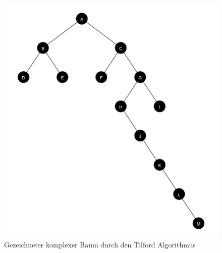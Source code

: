 \begin{figure}[H]
    \centering
    \includegraphics[scale = 0.05]{abbildungen/baum_algo_3_n1}
    \caption{Gezeichneter komplexer Baum durch den Tilford Algorithmus}
    \label{pic:baum_algo_3_n1} 
\end{figure}

